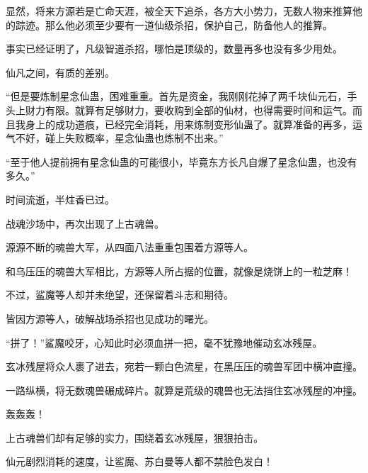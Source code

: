 \begin{this_body}
显然，将来方源若是亡命天涯，被全天下追杀，各方大小势力，无数人物来推算他的踪迹。那么他必须至少要有一道仙级杀招，保护自己，防备他人的推算。

事实已经证明了，凡级智道杀招，哪怕是顶级的，数量再多也没有多少用处。

仙凡之间，有质的差别。

“但是要炼制星念仙蛊，困难重重。首先是资金，我刚刚花掉了两千块仙元石，手头上财力有限。就算有足够财力，要收购到全部的仙材，也得需要时间和运气。而且我身上的成功道痕，已经完全消耗，用来炼制变形仙蛊了。就算准备的再多，运气不好，碰上失败概率，星念仙蛊也炼制不出来。”

“至于他人提前拥有星念仙蛊的可能很小，毕竟东方长凡自爆了星念仙蛊，也没有多久。”

时间流逝，半炷香已过。

战魂沙场中，再次出现了上古魂兽。

源源不断的魂兽大军，从四面八法重重包围着方源等人。

和乌压压的魂兽大军相比，方源等人所占据的位置，就像是烧饼上的一粒芝麻！

不过，鲨魔等人却并未绝望，还保留着斗志和期待。

皆因方源等人，破解战场杀招也见成功的曙光。

“拼了！”鲨魔咬牙，心知此时必须血拼一把，毫不犹豫地催动玄冰残屋。

玄冰残屋将众人裹了进去，宛若一颗白色流星，在黑压压的魂兽军团中横冲直撞。

一路纵横，将无数魂兽碾成碎片。就算是荒级的魂兽也无法挡住玄冰残屋的冲撞。

轰轰轰！

上古魂兽们却有足够的实力，围绕着玄冰残屋，狠狠拍击。

仙元剧烈消耗的速度，让鲨魔、苏白曼等人都不禁脸色发白！

\end{this_body}

